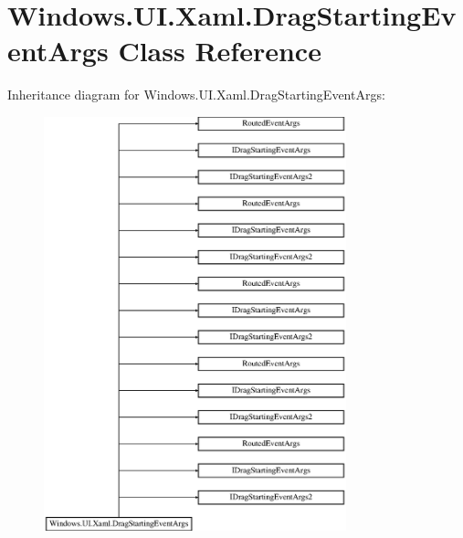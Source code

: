 \hypertarget{class_windows_1_1_u_i_1_1_xaml_1_1_drag_starting_event_args}{}\section{Windows.\+U\+I.\+Xaml.\+Drag\+Starting\+Event\+Args Class Reference}
\label{class_windows_1_1_u_i_1_1_xaml_1_1_drag_starting_event_args}
Inheritance diagram for Windows.\+U\+I.\+Xaml.\+Drag\+Starting\+Event\+Args\+:\begin{figure}[H]
\begin{center}
\leavevmode
\includegraphics[height=12.000000cm]{class_windows_1_1_u_i_1_1_xaml_1_1_drag_starting_event_args}
\end{center}
\end{figure}
